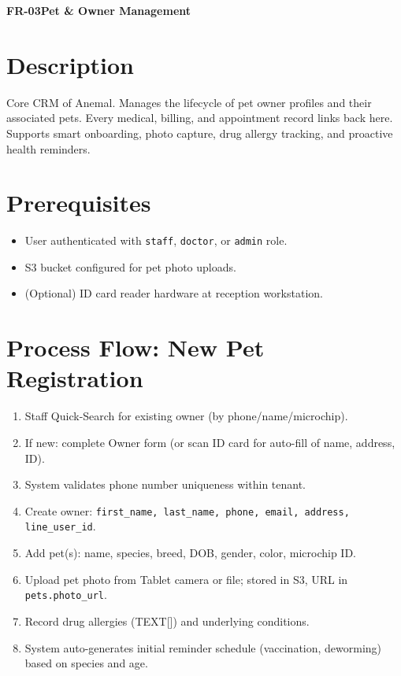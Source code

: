 \documentclass[12pt,a4paper]{report}
\newcommand{\moduleheader}[2]{%
  \par\vspace{6pt}%
  \noindent\colorbox{branddark}{\color{white}\textbf{\small #1}}\quad\textbf{\large #2}%
  \par\vspace{4pt}%
}
\begin{document}
\moduleheader{FR-03}{Pet \& Owner Management}

\section{Description}

Core CRM of Anemal. Manages the lifecycle of pet owner profiles and their associated pets. Every medical, billing, and appointment record links back here. Supports smart onboarding, photo capture, drug allergy tracking, and proactive health reminders.

\section{Prerequisites}

\begin{itemize}
  \item User authenticated with \texttt{staff}, \texttt{doctor}, or \texttt{admin} role.
  \item S3 bucket configured for pet photo uploads.
  \item (Optional) ID card reader hardware at reception workstation.
\end{itemize}

\section{Process Flow: New Pet Registration}

\begin{enumerate}
  \item Staff Quick-Search for existing owner (by phone/name/microchip).
  \item If new: complete Owner form (or scan ID card for auto-fill of name, address, ID).
  \item System validates phone number uniqueness within tenant.
  \item Create owner: \texttt{first\_name, last\_name, phone, email, address, line\_user\_id}.
  \item Add pet(s): name, species, breed, DOB, gender, color, microchip ID.
  \item Upload pet photo from Tablet camera or file; stored in S3, URL in \texttt{pets.photo\_url}.
  \item Record drug allergies (TEXT[]) and underlying conditions.
  \item System auto-generates initial reminder schedule (vaccination, deworming) based on species and age.
\end{enumerate}
\end{document}
